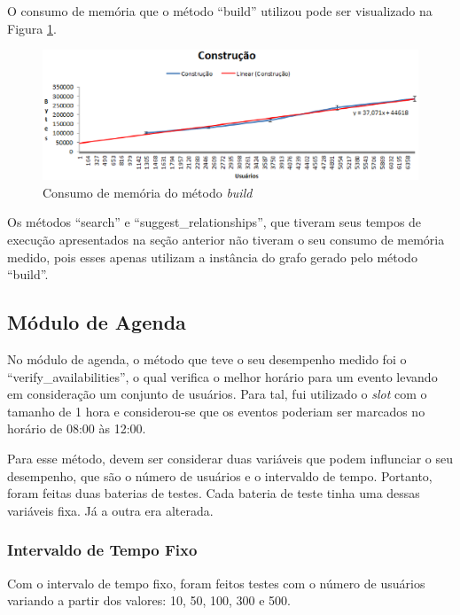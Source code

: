 O consumo de memória que o método ``build'' utilizou pode ser visualizado na Figura \ref{build_memoria}.

\begin{figure}[!h]
	\centering
	\includegraphics[scale=0.8]{figuras/resultados/graficos/construcao_memo.eps}
	\caption[Consumo de memória do método build]{Consumo de memória do método \textit{build}}
	\label{build_memoria}
\end{figure}

Os métodos ``search'' e ``suggest\_relationships'', que tiveram seus tempos de execução apresentados na seção anterior não tiveram o seu consumo de memória medido, pois esses apenas utilizam a instância do grafo gerado pelo método ``build''.

\subsection{Módulo de Agenda}

No módulo de agenda, o método que teve o seu desempenho medido foi o ``verify\_availabilities'', o qual verifica o melhor horário para um evento levando em consideração um conjunto de usuários. Para tal, fui utilizado o \textit{slot} com o tamanho de 1 hora e considerou-se que os eventos poderiam ser marcados no horário de 08:00 às 12:00.

Para esse método, devem ser considerar duas variáveis que podem influnciar o seu desempenho, que são o número de usuários e o intervaldo de tempo. Portanto, foram feitas duas baterias de testes. Cada bateria de teste tinha uma dessas variáveis fixa. Já a outra era alterada.

\subsubsection{Intervaldo de Tempo Fixo}

Com o intervalo de tempo fixo, foram feitos testes com o número de usuários variando a partir dos valores: 10, 50, 100, 300 e 500.

